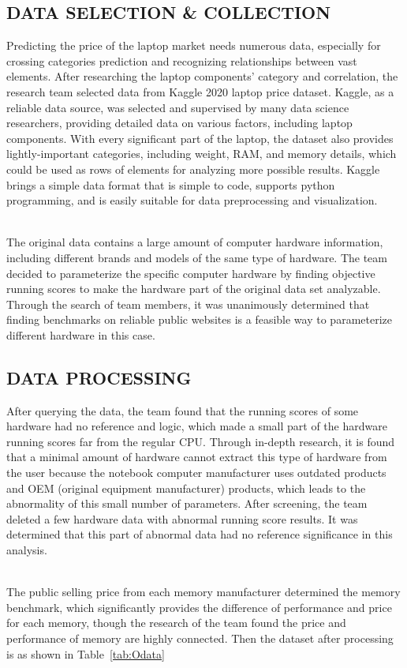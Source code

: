 \documentclass{scrartcl}
\begin{document}
\subsection{DATA SELECTION & COLLECTION }
Predicting the price of the laptop market needs numerous data, especially for crossing categories prediction and recognizing relationships between vast elements. After researching the laptop components’ category and correlation, the research team selected data from Kaggle 2020 laptop price dataset\cite{kumar_2022}. Kaggle, as a reliable data source, was selected and supervised by many data science researchers, providing detailed data on various factors, including laptop components. With every significant part of the laptop, the dataset also provides lightly-important categories, including weight, RAM, and memory details, which could be used as rows of elements for analyzing more possible results. Kaggle brings a simple data format that is simple to code, supports python programming, and is easily suitable for data preprocessing and visualization. \par

~\\
\noindent The original data contains a large amount of computer hardware information, including different brands and models of the same type of hardware. The team decided to parameterize the specific computer hardware by finding objective running scores to make the hardware part of the original data set analyzable. Through the search of team members, it was unanimously determined that finding benchmarks\cite{passmark} on reliable public websites is a feasible way to parameterize different hardware in this case. 


\subsection{DATA PROCESSING}
After querying the data, the team found that the running scores of some hardware had no reference and logic, which made a small part of the hardware running scores far from the regular CPU. Through in-depth research, it is found that a minimal amount of hardware cannot extract this type of hardware from the user because the notebook computer manufacturer uses outdated products and OEM (original equipment manufacturer) products, which leads to the abnormality of this small number of parameters. After screening, the team deleted a few hardware data with abnormal running score results. It was determined that this part of abnormal data had no reference significance in this analysis.\par
~\\
\noindent The public selling price from each memory manufacturer determined the memory benchmark, which significantly provides the difference of performance and price for each memory, though the research of the team found the price and performance of memory are highly connected. Then the dataset after processing is as shown in Table~\ref{tab:Odata}
~\\
\end{document}
